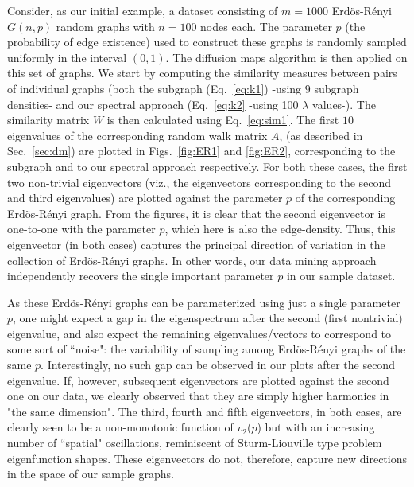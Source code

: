 Consider, as our initial example, a dataset consisting of $m=1000$
Erd\"{o}s-R\'{e}nyi $G(n,p)$ random graphs \cite{erdos_random_1959} with
$n=100$ nodes each.
% 
The parameter $p$ (the probability of edge existence) used to
construct these graphs is randomly sampled uniformly in the interval
$(0,1)$.
% 
The diffusion maps algorithm is then applied on this set of graphs.
% 
We start by computing the similarity measures between pairs of
individual graphs (both the subgraph (Eq.~\ref{eq:k1}) -using $9$
subgraph densities- and our spectral approach (Eq.~\ref{eq:k2} -using
100 $\lambda$ values-).
% 
The similarity matrix $W$ is then calculated using Eq.~\ref{eq:sim1}.
% 
The first $10$ eigenvalues of the corresponding random walk matrix
$A$, (as described in Sec.~\ref{sec:dm}) are plotted in
Figs.~\ref{fig:ER1} and \ref{fig:ER2}, corresponding to the subgraph
and to our spectral approach respectively.
% 
For both these cases, the first two non-trivial eigenvectors (viz.,
the eigenvectors corresponding to the second and third eigenvalues)
are plotted against the parameter $p$ of the corresponding
Erd\"{o}s-R\'{e}nyi graph.
% 
From the figures, it is clear that the second eigenvector is
one-to-one with the parameter $p$, which here is also the
edge-density.
% 
Thus, this eigenvector (in both cases) captures the principal
direction of variation in the collection of Erd\"{o}s-R\'{e}nyi
graphs.
% 
In other words, our data mining approach independently recovers the
single important parameter $p$ in our sample dataset.
% 

As these Erd\"{o}s-R\'{e}nyi graphs can be parameterized using just a
single parameter $p$, one might expect a gap in the eigenspectrum
after the second (first nontrivial) eigenvalue, and also expect the
remaining eigenvalues/vectors to correspond to some sort of ``noise":
the variability of sampling among Erd\"{o}s-R\'{e}nyi graphs of the
same $p$.
% 
Interestingly, no such gap can be observed in our plots after the
second eigenvalue.
% 
If, however, subsequent eigenvectors are plotted against the second
one on our data, we clearly observed that they are simply higher
harmonics in "the same dimension".
% 
The third, fourth and fifth eigenvectors, in both cases, are clearly
seen to be a non-monotonic function of $v_2$($p$) but with an
increasing number of ``spatial" oscillations, reminiscent of
Sturm-Liouville type problem eigenfunction shapes.
% 
These eigenvectors do not, therefore, capture new directions in the
space of our sample graphs.
% 

